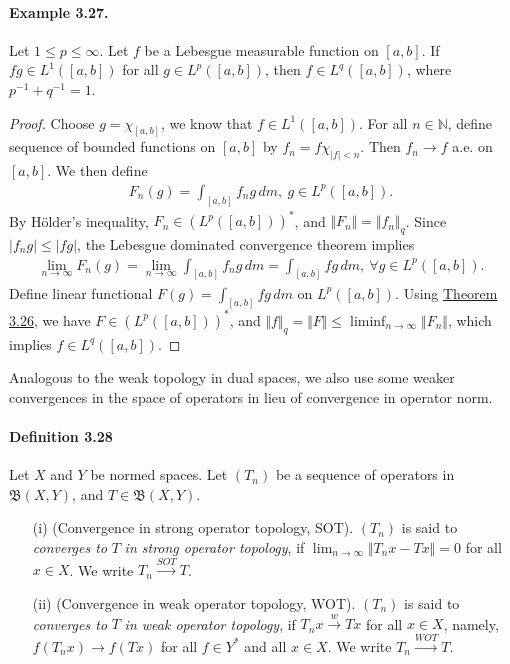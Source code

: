 \documentclass{article}
\begin{document}
\paragraph{Example 3.27.\label{example:3.27}} Let $1\leq p\leq\infty$. Let $f$ be a Lebesgue measurable function on $[a,b]$. If $fg\in L^1([a,b])$ for all $g\in L^p([a,b])$, then $f\in L^q([a,b])$, where $p^{-1}+q^{-1}=1$.
\begin{proof}
	Choose $g=\chi_{[a,b]}$, we know that $f\in L^1([a,b])$. For all $n\in\mathbb{N}$, define sequence of bounded functions on $[a,b]$ by $f_n = f\chi_{\vert f\vert < n}$. Then $f_n\to f$ a.e. on $[a,b]$. We then define
	\begin{align*}
		F_n(g) = \int_{[a,b]} f_n g\,dm,\ g\in L^p([a,b]).
	\end{align*}
	By Hölder's inequality, $F_n\in (L^p([a,b]))^*$, and $\Vert F_n\Vert=\Vert f_n\Vert_q$. Since $\vert f_n g\vert\leq\vert fg\vert$, the Lebesgue dominated convergence theorem implies
	\begin{align*}
		\lim_{n\to\infty} F_n(g) = \lim_{n\to\infty} \int_{[a,b]} f_n g\,dm = \int_{[a,b]} fg\,dm,\ \forall g\in L^p([a,b]).
	\end{align*}
	Define linear functional $F(g)=\int_{[a,b]} fg\,dm$ on $L^p([a,b])$. Using \hyperref[thm:3.26]{Theorem 3.26}, we have $F\in(L^p([a,b]))^*$, and $\Vert f\Vert_q=\Vert F\Vert\leq\liminf_{n\to\infty}\Vert F_n\Vert$, which implies $f\in L^q([a,b])$.
\end{proof}

Analogous to the weak topology in dual spaces, we also use some weaker convergences in the space of operators in lieu of convergence in operator norm.

\paragraph{Definition 3.28\label{def:3.28}} Let $X$ and $Y$ be normed spaces. Let $(T_n)$ be a sequence of operators in $\mathfrak{B}(X,Y)$, and $T\in\mathfrak{B}(X,Y)$.
\begin{itemize}
\item [(i)] (Convergence in strong operator topology, SOT). $(T_n)$ is said to \textit{converges to} $T$ \textit{in strong operator topology}, if $\lim_{n\to\infty}\Vert T_n x-Tx\Vert=0$ for all $x\in X$. We write $T_n\overset{SOT}{\to} T$.
\item [(ii)] (Convergence in weak operator topology, WOT). $(T_n)$ is said to \textit{converges to} $T$ \textit{in weak operator topology}, if $T_n x\overset{w}{\to} Tx$ for all $x\in X$, namely, $f(T_n x)\to f(Tx)$ for all $f\in Y^*$ and all $x\in X$. We write $T_n\overset{WOT}{\to} T$.
\end{itemize}
\end{document}
